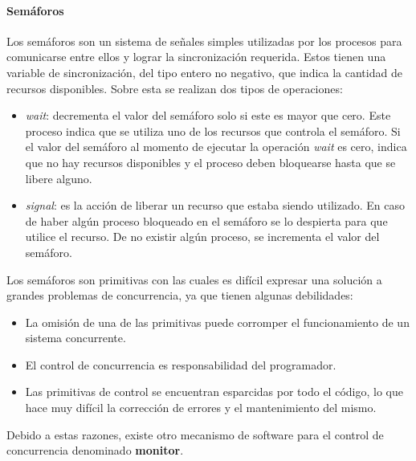\paragraph{Semáforos}
Los semáforos son un sistema de señales simples utilizadas por los procesos para comunicarse entre ellos y lograr la sincronización requerida.
Estos tienen una variable de sincronización, del tipo entero no negativo, que indica la cantidad de recursos disponibles. Sobre esta se realizan dos tipos de operaciones:

\begin{itemize}
    \item \textit{wait}: decrementa el valor del semáforo solo si este es mayor que cero. Este proceso indica que se utiliza uno de los recursos que controla el semáforo. Si el valor del semáforo al momento de ejecutar la operación \textit{wait} es cero, indica que no hay recursos disponibles y el proceso deben bloquearse hasta que se libere alguno.
    \item \textit{signal}: es la acción de liberar un recurso que estaba siendo utilizado. En caso de haber algún proceso bloqueado en el semáforo se lo despierta para que utilice el recurso. De no existir algún proceso, se incrementa el valor del semáforo.
\end{itemize}

Los semáforos son primitivas con las cuales es difícil expresar una solución a grandes problemas de concurrencia, ya que tienen algunas debilidades:
\begin{itemize}
    \item La omisión de una de las primitivas puede corromper el funcionamiento de un sistema concurrente.
    \item El control de concurrencia es responsabilidad del programador.
    \item Las primitivas de control se encuentran esparcidas por todo el código, lo que hace muy difícil la corrección de errores y el mantenimiento del mismo.
\end{itemize}

Debido a estas razones, existe otro mecanismo de software para el control de concurrencia denominado \textbf{monitor}.

